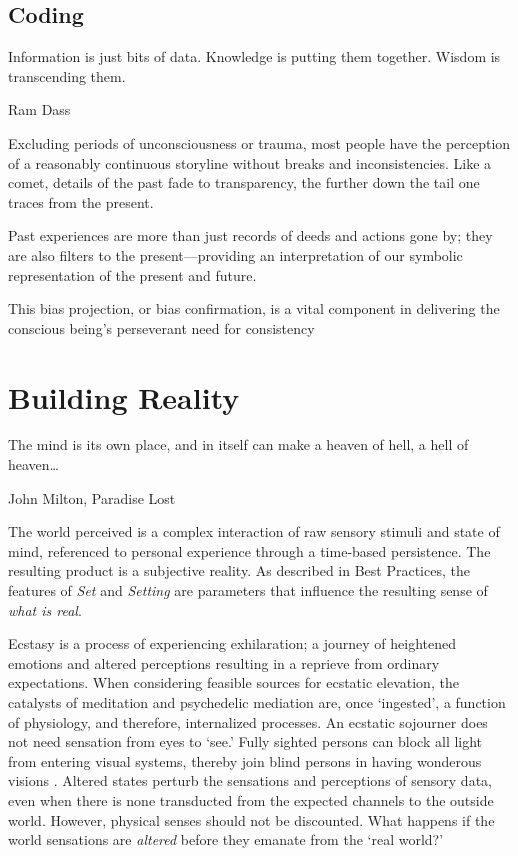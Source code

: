 \documentclass{UIdahoMastersThesis}
\begin{document}
\section{Coding}

\epigraph{Information is just bits of data. Knowledge is putting them together. Wisdom is transcending them.}{Ram Dass}

Excluding periods of unconsciousness or trauma, most people have the perception of a reasonably continuous storyline without breaks and inconsistencies. Like a comet, details of the past fade to transparency, the further down the tail one traces from the present. 

Past experiences are more than just records of deeds and actions gone by; they are also filters to the present---providing an interpretation of our symbolic representation of the present and future.

This bias projection, or bias confirmation, is a vital component in delivering the conscious being's perseverant need for consistency
\chapter{Building Reality}
\label{Chapter:BuildingReality}
\epigraph {The mind is its own place, and in itself can make a heaven of hell, a hell of heaven\ldots}{John Milton, Paradise Lost}

\vspace{9mm}

The world perceived is a complex interaction of raw sensory stimuli and state of mind, referenced to personal experience through a time-based persistence. The resulting product is a subjective reality. As described in Best Practices, the features of \emph{Set} and \emph{Setting} are parameters that influence the resulting sense of \emph{what is real}.

Ecstasy is a process of experiencing exhilaration; a journey of heightened emotions and altered perceptions resulting in a reprieve from ordinary expectations. When considering feasible sources for ecstatic elevation, the catalysts of meditation and psychedelic mediation are, once `ingested', a function of physiology, and therefore, internalized processes. An ecstatic sojourner does not need sensation from eyes to `see.' Fully sighted persons can block all light from entering visual systems, thereby join blind persons in having wonderous visions \cite{sacks_hallucinations_2012}. Altered states perturb the sensations and perceptions of sensory data, even when there is none transducted from the expected channels to the outside world. However, physical senses should not be discounted. What happens if the world sensations are \emph{altered} before	they emanate from the `real world?'
\end{document}
